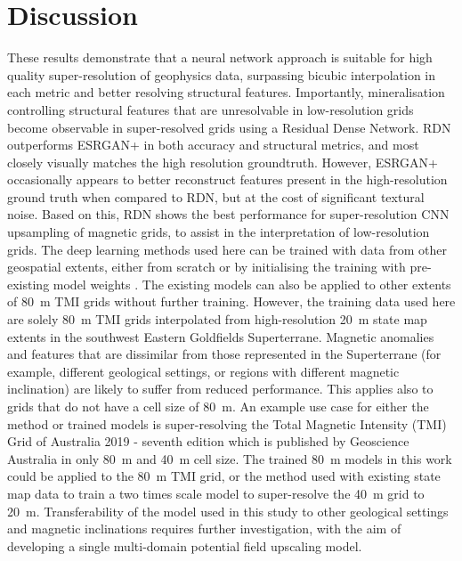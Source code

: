 \documentclass[manuscript.tex]{subfiles}
\begin{document}
\section{Discussion}
These results demonstrate that a neural network approach is suitable for high quality super-resolution of geophysics data, surpassing bicubic interpolation in each metric and better resolving structural features.
Importantly, mineralisation controlling structural features that are unresolvable in low-resolution grids become observable in super-resolved grids using a Residual Dense Network.
RDN\textdaggerdbl{} outperforms ESRGAN+ in both accuracy and structural metrics, and most closely visually matches the high resolution groundtruth.
However, ESRGAN+ occasionally appears to better reconstruct features present in the high-resolution ground truth when compared to RDN\textdaggerdbl{}, but at the cost of significant textural noise.
Based on this, RDN\textdaggerdbl{} shows the best performance for super-resolution CNN upsampling of magnetic grids, to assist in the interpretation of low-resolution grids.
The deep learning methods used here can be trained with data from other geospatial extents, either from scratch or by initialising the training with pre-existing model weights \parencite[][e.g.]{wangMineGANEffectiveKnowledge2020}.
The existing models can also be applied to other extents of \SI{80}{\metre} TMI grids without further training.
However, the training data used here are solely \SI{80}{\metre} TMI grids interpolated from high-resolution \SI{20}{\metre} state map extents in the southwest Eastern Goldfields Superterrane.
Magnetic anomalies and features that are dissimilar from those represented in the Superterrane (for example, different geological settings, or regions with different magnetic inclination) are likely to suffer from reduced performance.
This applies also to grids that do not have a cell size of \SI{80}{\metre}.
An example use case for either the method or trained models is super-resolving the Total Magnetic Intensity (TMI) Grid of Australia 2019 - seventh edition which is published by Geoscience Australia in only \SI{80}{\metre} and \SI{40}{\metre} cell size.
The trained \SI{80}{\metre} models in this work could be applied to the \SI{80}{\metre} TMI grid, or the method used with existing state map data to train a two times scale model to super-resolve the \SI{40}{\metre} grid to \SI{20}{\metre}.
Transferability of the model used in this study to other geological settings and magnetic inclinations requires further investigation, with the aim of developing a single multi-domain potential field upscaling model.
\end{document}
